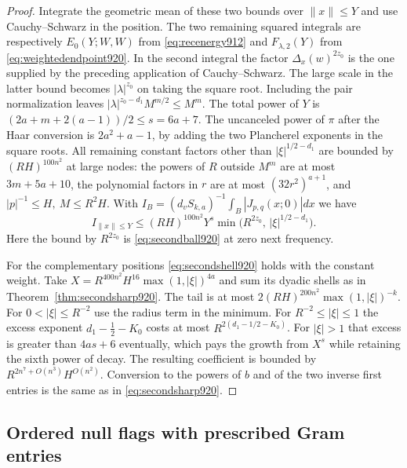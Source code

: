 \documentclass[a4paper,11pt]{article}
\theoremstyle{definition}
\theoremstyle{remark}
\numberwithin{equation}{section}
\begin{document}
\begin{proof}
Integrate the geometric mean of these two bounds over
\(\|x\|\le Y\) and use Cauchy--Schwarz in the position.
The two remaining squared integrals are respectively
\(E_0(Y;W,W)\) from \eqref{eq:recenergy912} and
\(F_{\lambda,2}(Y)\) from \eqref{eq:weightedendpoint920}.
In the second integral the factor \(\Delta_x(w)^{2z_0}\)
is the one supplied by the preceding application of
Cauchy--Schwarz. The large scale in the latter bound becomes
\(|\lambda|^{z_0}\) on taking the square root. Including the
pair normalization leaves
\(|\lambda|^{z_0-d_1}M^{m/2}\le M^m\).
The total power of \(Y\) is
\((2a+m+2(a-1))/2\le s=6a+7\). The uncanceled power of \(\pi\)
after the Haar conversion is \(2a^2+a-1\), by adding the
two Plancherel exponents in the square roots. All remaining
constant factors other than \(|\xi|^{1/2-d_1}\) are bounded
by \((RH)^{100n^2}\) at large nodes: the powers of \(R\)
outside \(M^m\) are at most \(3m+5a+10\), the polynomial
factors in \(r\) are at most \((32r^2)^{a+1}\), and
\(|p|^{-1}\le H,\ M\le R^2H\). With
\(I_B=(d_vS_{k,a})^{-1}\int_B|J_{p,q}(x;0)|dx\) we have
\[
 I_{\|x\|\le Y}\le (RH)^{100n^2}Y^s
           \min\bigl(R^{2z_0},\,|\xi|^{1/2-d_1}\bigr).
\]
Here the bound by \(R^{2z_0}\) is \eqref{eq:secondball920}
at zero next frequency.

For the complementary positions \eqref{eq:secondshell920}
holds with the constant weight. Take
\(X=R^{400n^2}H^{16}\max(1,|\xi|)^{4a}\) and sum its
dyadic shells as in Theorem~\ref{thm:secondsharp920}.
The tail is at most \(2(RH)^{200n^2}\max(1,|\xi|)^{-k}\).
For \(0<|\xi|\le R^{-2}\) use the radius term in the minimum.
For \(R^{-2}\le|\xi|\le1\) the excess exponent
\(d_1-\tfrac12-K_0\) costs at most
\(R^{2(d_1-1/2-K_0)}\). For \(|\xi|>1\) that excess is
greater than \(4as+6\) eventually, which pays the growth
from \(X^s\) while retaining the sixth power of decay.
The resulting coefficient is bounded by
\(R^{2n^7+O(n^3)}H^{O(n^2)}\). Conversion to the powers
of \(b\) and of the two inverse first entries is the same as
in \eqref{eq:secondsharp920}.
\end{proof}
\clearpage

\subsection{Ordered null flags with prescribed Gram entries}
\label{sec:orderedflags922}
\end{document}
